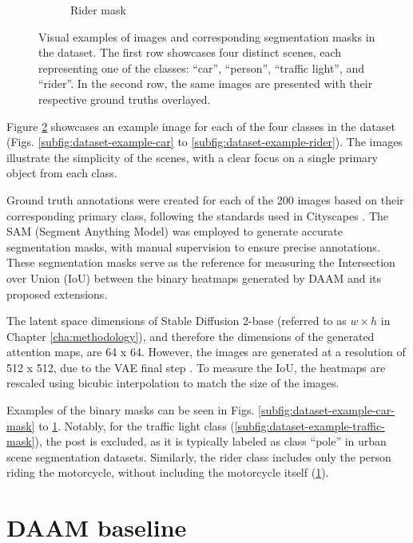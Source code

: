 \begin{figure}
\begin{subfigure}{0.24\columnwidth}
   \caption{Rider mask}
   \label{subfig:dataset-example-rider-mask}
  \end{subfigure}
  \caption[Synthetic dataset examples]{Visual examples of images and corresponding segmentation masks in the dataset. The first row showcases four distinct scenes, each representing one of the classes: ``car'', ``person'', ``traffic light'', and ``rider''. In the second row, the same images are presented with their respective ground truths overlayed.}
  \label{fig:dataset-examples}
  \end{figure}
  
Figure \ref{fig:dataset-examples} showcases an example image for each of the four classes in the dataset (Figs. \ref{subfig:dataset-example-car} to \ref{subfig:dataset-example-rider}). The images illustrate the simplicity of the scenes, with a clear focus on a single primary object from each class.

Ground truth annotations were created for each of the 200 images based on their corresponding primary class, following the standards used in Cityscapes \cite{Cityscapes}. The SAM (Segment Anything Model) \cite{SAM} was employed to generate accurate segmentation masks, with manual supervision to ensure precise annotations. These segmentation masks serve as the reference for measuring the Intersection over Union (IoU) between the binary heatmaps generated by DAAM and its proposed extensions.

The latent space dimensions of Stable Diffusion 2-base (referred to as $w \times h$ in Chapter \ref{cha:methodology}), and therefore the dimensions of the generated attention maps, are 64 x 64. However, the images are generated at a resolution of 512 x 512, due to the VAE final step \cite{rombach2022high}. To measure the IoU, the heatmaps are rescaled using bicubic interpolation to match the size of the images.


Examples of the binary masks can be seen in Figs. \ref{subfig:dataset-example-car-mask} to \ref{subfig:dataset-example-rider-mask}. Notably, for the traffic light class (\ref{subfig:dataset-example-traffic-mask}), the post is excluded, as it is typically labeled as class ``pole'' in urban scene segmentation datasets. Similarly, the rider class includes only the person riding the motorcycle, without including the motorcycle itself (\ref{subfig:dataset-example-rider-mask}).




\section{DAAM baseline}
\label{sec:experiment-daam}

